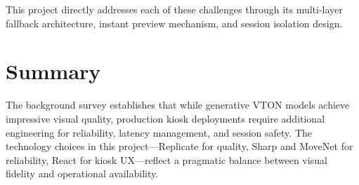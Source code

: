 This project directly addresses each of these challenges through its multi-layer fallback architecture, instant preview mechanism, and session isolation design.

\section{Summary}
\label{sec:background-summary}

The background survey establishes that while generative VTON models achieve impressive visual quality, production kiosk deployments require additional engineering for reliability, latency management, and session safety. The technology choices in this project---Replicate for quality, Sharp and MoveNet for reliability, React for kiosk UX---reflect a pragmatic balance between visual fidelity and operational availability.
